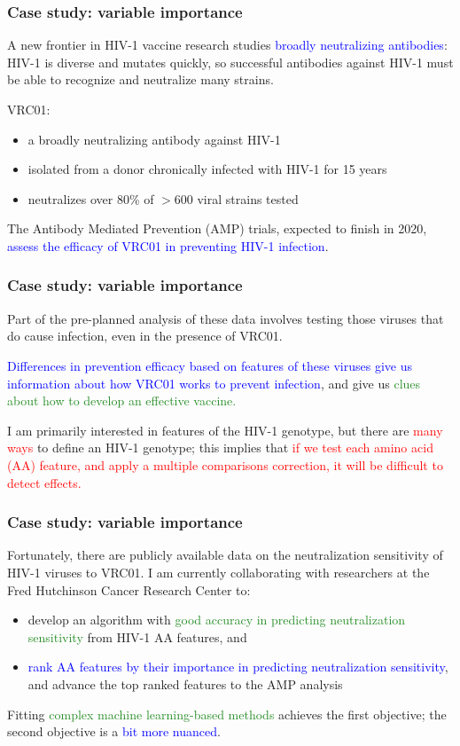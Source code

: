 \documentclass[12pt, 
hyperref={colorlinks=true, linkcolor=blue, urlcolor=cyan},dvipsnames]{beamer}
\begin{document}
\begin{frame}
\frametitle{Case study: variable importance}
A new frontier in HIV-1 vaccine research studies \textcolor{blue}{broadly neutralizing antibodies}: HIV-1 is diverse and mutates quickly, so successful antibodies against HIV-1 must be able to recognize and neutralize many strains. \pause

VRC01: \vspace{-0.3cm}
\begin{itemize}
\item a broadly neutralizing antibody against HIV-1
\item isolated from a donor chronically infected with HIV-1 for 15 years
\item neutralizes over 80\% of $> 600$ viral strains tested
\end{itemize} \pause

The Antibody Mediated Prevention (AMP) trials, expected to finish in 2020, \textcolor{blue}{assess the efficacy of VRC01 in preventing HIV-1 infection}.
\end{frame}

\begin{frame}
\frametitle{Case study: variable importance}
Part of the pre-planned analysis of these data involves testing those viruses that do cause infection, even in the presence of VRC01.

\textcolor{blue}{Differences in prevention efficacy based on features of these viruses give us information about how VRC01 works to prevent infection}, and give us \textcolor{ForestGreen}{clues about how to develop an effective vaccine.} \pause

I am primarily interested in features of the HIV-1 genotype, but there are \textcolor{red}{many ways} to define an HIV-1 genotype; this implies that \textcolor{red}{if we test each amino acid (AA) feature, and apply a multiple comparisons correction, it will be difficult to detect effects. }
\end{frame}

\begin{frame}
\frametitle{Case study: variable importance}
Fortunately, there are publicly available data on the neutralization sensitivity of HIV-1 viruses to VRC01. I am currently collaborating with researchers at the Fred Hutchinson Cancer Research Center to:
\begin{itemize}
\item develop an algorithm with \textcolor{ForestGreen}{good accuracy in predicting neutralization sensitivity} from HIV-1 AA features, and
\item \textcolor{blue}{rank AA features by their importance in predicting neutralization sensitivity}, and advance the top ranked features to the AMP analysis
\end{itemize}

Fitting \textcolor{ForestGreen}{complex machine learning-based methods} achieves the first objective; the second objective is a \textcolor{blue}{bit more nuanced}.
\end{frame}
\end{document}
